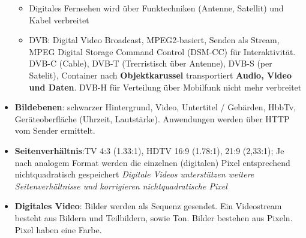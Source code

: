 \documentclass[12pt,landscape]{article}
\begin{document}
\begin{multicols}{3}
\begin{itemize}
\begin{itemize}
    \item Digitales Fernsehen wird über Funktechniken (Antenne, Satellit) und Kabel verbreitet
    \item DVB: Digital Video Broadcast, MPEG2-basiert, Senden als Stream, MPEG Digital Storage Command Control (DSM-CC) für Interaktivität. DVB-C (Cable), DVB-T (Trerristisch über Antenne), DVB-S (per Satelit), Container nach \textbf{Objektkarussel} transportiert \textbf{Audio, Video und Daten}. DVB-H für Verteilung über Mobilfunk nicht mehr verbreitet
\end{itemize}
\item \textbf{Bildebenen}: schwarzer Hintergrund, Video, Untertitel / Gebärden, HbbTv, Geräteoberfläche (Uhrzeit, Lautstärke). Anwendungen werden über HTTP vom Sender ermittelt.
\item \textbf{Seitenverhältnis}:TV 4:3 (1.33:1), HDTV 16:9 (1.78:1), 21:9 (2,33:1); Je nach analogem Format werden die einzelnen (digitalen) Pixel entsprechend nichtquadratisch gespeichert \textit{Digitale Videos unterstützen weitere Seitenverhältnisse und korrigieren nichtquadratische Pixel}
\item \textbf{Digitales Video}: Bilder werden als Sequenz gesendet. Ein Videostream besteht aus Bildern und Teilbildern, sowie Ton.
Bilder bestehen aus Pixeln. Pixel haben eine Farbe.

\end{itemize}
\end{multicols}
\end{document}

